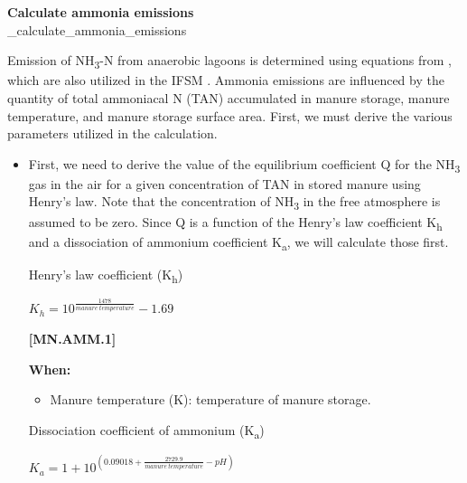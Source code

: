 \begin{refsection}
\textbf{Calculate ammonia emissions}\\
\_calculate\_ammonia\_emissions
\vspace{0.2cm}

Emission of NH\textsubscript{3}-N from anaerobic lagoons is determined using equations from \cite{Rotz2006}, which are also utilized in the IFSM \parencite{Rotz2023}. Ammonia emissions are influenced by the quantity of total ammoniacal N (TAN) accumulated in manure storage, manure temperature, and manure storage surface area. First, we must derive the various parameters utilized in the calculation.

    \begin{itemize}
        \item First, we need to derive the value of the equilibrium coefficient Q for the NH\textsubscript{3} gas in the air for a given concentration of TAN in stored manure using Henry’s law. Note that the concentration of NH\textsubscript{3} in the free atmosphere is assumed to be zero. Since Q is a function of the Henry’s law coefficient K\textsubscript{h} and a dissociation of ammonium coefficient K\textsubscript{a}, we will calculate those first. 
        \vspace{0.2cm}
        
         Henry’s law coefficient (K\textsubscript{h})
         \vspace{0.2cm}

    \begin{center}
\(K_h = 10 ^\frac{1478} {manure\ temperature }- 1.69 \)
    \end{center}
        \vspace{0.5cm} 
    
            {\raggedleft \textbf{[MN.AMM.1]}\par}
            \vspace{0.5cm}
            
\textbf{When:}
    \begin{itemize}
        \item Manure temperature (K): temperature of manure storage.
    \end{itemize}

         Dissociation coefficient of ammonium (K\textsubscript{a})
         \vspace{0.2cm}

    \begin{center}
\(K_a  = 1 + 10 ^{(0.09018 + \frac{2729.9} {manure\ temperature} - pH )}\)
    \end{center}
        \vspace{0.5cm} 
    

\end{itemize}
\end{refsection}
